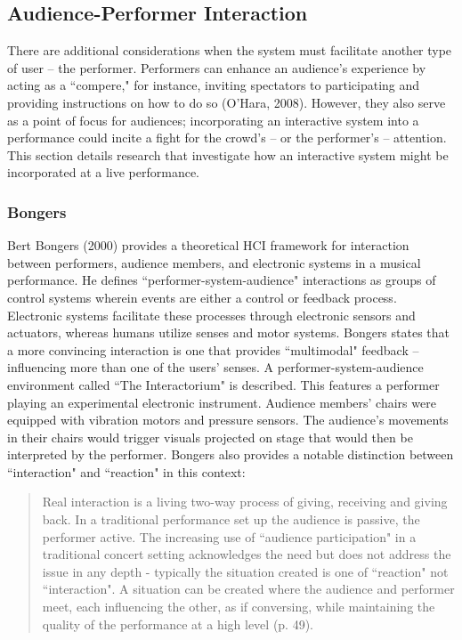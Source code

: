 \subsection{Audience-Performer Interaction}

There are additional considerations when the system must facilitate another type of user -- the performer. Performers can enhance an audience's experience by acting as a ``compere," for instance, inviting spectators to participating and providing instructions on how to do so (O'Hara, 2008). However, they also serve as a point of focus for audiences; incorporating an interactive system into a performance could incite a fight for the crowd's -- or the performer's -- attention. This section details research that investigate how an interactive system might be incorporated at a live performance.

\subsubsection{Bongers}

Bert Bongers (2000) provides a theoretical HCI framework for interaction between performers, audience members, and electronic systems in a musical performance. He defines ``performer-system-audience" interactions as groups of control systems wherein events are either a control or feedback process. Electronic systems facilitate these processes through electronic sensors and actuators, whereas humans utilize senses and motor systems. Bongers states that a more convincing interaction is one that provides ``multimodal" feedback -- influencing more than one of the users' senses. A performer-system-audience environment called ``The Interactorium" is described. This features a performer playing an experimental electronic instrument. Audience members' chairs were equipped with vibration motors and pressure sensors. The audience's movements in their chairs would trigger visuals projected on stage that would then be interpreted by the performer. Bongers also provides a notable distinction between ``interaction" and ``reaction" in this context:

\begin{quotation}
\onehalfspacing	
Real interaction is a living two-way process of giving, receiving and giving back. In a traditional performance set up the audience is passive, the performer active. The increasing use of ``audience participation" in a traditional concert setting acknowledges the need but does not address the issue in any depth - typically the situation created is one of ``reaction" not ``interaction". A situation can be created where the audience and performer meet, each influencing the other, as if conversing, while maintaining the quality of the performance at a high level (p. 49).
\end{quotation}


